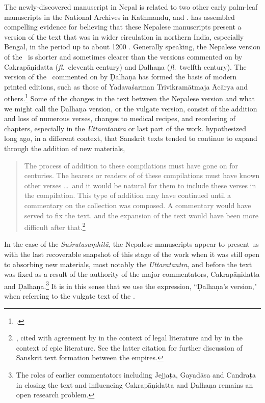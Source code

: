 The newly-discovered manuscript in Nepal is related to two other early palm-leaf
manuscripts in the National Archives in Kathmandu, 
and . \citet{kleb-2010,kleb-2021b} has assembled
compelling evidence for believing that these Nepalese manuscripts present a
version of the text that was in wider circulation in northern India, especially
Bengal, in the period up to about 1200 \CE. Generally speaking, the Nepalese
version of the \SS\ is shorter and sometimes clearer than the versions commented
on by Cakrapāṇidatta (\emph{fl.}\ eleventh century) and Ḍalhaṇa (\emph{fl.}\
twelfth century).  The version of the \SS\ commented on by Ḍalhaṇa has formed the
basis of modern printed editions, such as those of Yadavaśarman Trivikramātmaja
Ācārya and others.\footcite{susr-trikamji1,vulgate,shar-susr}  Some of the changes
in the text between the Nepalese version and what we might call the Ḍalhaṇa
version, or the vulgate version, consist of the addition and loss of numerous
verses, changes to medical recipes, and reordering of chapters, especially in the
\emph{Uttaratantra} or last part of the work.  \citeauthor{lari-2003} hypothesized
long ago, in a different context, that Sanskrit texts tended to continue to expand
through the addition of new materials,
\begin{quote}
The process of addition to these compilations must have gone on for centuries. The
hearers or readers of of these compilations must have known other verses \ldots\
and it would be natural for them to include these verses in the compilation. This
type of  addition may have continued until a commentary on the collection was
composed.   A commentary would have served to fix the text. and the expansion of
the text would have been more difficult after
that.\footnote{\cite[xii]{lari-2003}, cited with agreement by
    \citet[51]{oliv-manu} in the context of legal literature and by
    \citet[62--63]{bron-how} in the context of epic literature.  See the latter
    citation for further discussion of Sanskrit text formation between the empires. 
    }
\end{quote}
In the case of the \emph{Suśrutasaṃhitā}, the Nepalese manuscripts appear to present us 
with the last recoverable snapshot of this stage of the work when it was still open to 
absorbing new materials, most notably the \emph{Uttaratantra}, and before the text was 
fixed as a result of the authority of the major commentators, Cakrapāṇidatta and 
Ḍalhaṇa.\footnote{The roles of earlier commentators including Jejjaṭa, Gayadāsa and 
Candraṭa in closing the text and influencing Cakrapāṇidatta and Ḍalhaṇa remains an open 
research problem.}  It is in this sense that we use the expression, ``Ḍalhaṇa's version," when 
referring to the vulgate text of the \SS.

